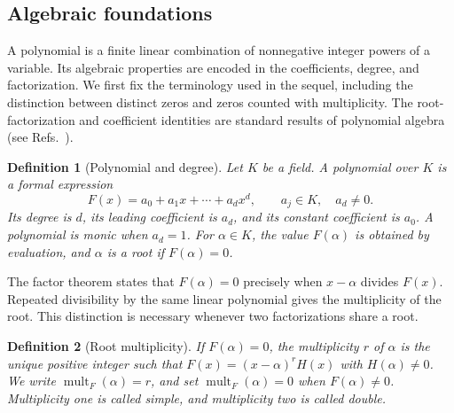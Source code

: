\documentclass[11pt,a4paper]{article}
\numberwithin{equation}{section}
\theoremstyle{uprightpaper}
\newtheorem{definition}{Definition}[section]
\newcommand{\mult}{\operatorname{mult}}
\begin{document}
\subsection{Algebraic foundations}\label{subsec:polynomial-foundations}

A polynomial is a finite linear combination of nonnegative integer powers of a variable. Its algebraic properties are encoded in the coefficients, degree, and factorization. We first fix the terminology used in the sequel, including the distinction between distinct zeros and zeros counted with multiplicity. The root-factorization and coefficient identities are standard results of polynomial algebra (see Refs.~\cite{barbeau1989, dummit2004}).

\begin{definition}[Polynomial and degree]\label{def:polynomial}
Let $K$ be a field. A polynomial over $K$ is a formal expression
\begin{equation}\label{eq:polynomial}
 F(x)=a_0+a_1x+\cdots+a_dx^d,\qquad
 a_j\in K,\quad a_d\neq0.
\end{equation}
Its degree is $d$, its leading coefficient is $a_d$, and its constant coefficient is $a_0$. A polynomial is \emph{monic} when $a_d=1$. For $\alpha\in K$, the value $F(\alpha)$ is obtained by evaluation, and $\alpha$ is a root if $F(\alpha)=0$.
\end{definition}

The factor theorem states that $F(\alpha)=0$ precisely when $x-\alpha$
divides $F(x)$. Repeated divisibility by the same linear polynomial gives
the multiplicity of the root. This distinction is necessary whenever two
factorizations share a root.

\begin{definition}[Root multiplicity]\label{def:mult}
If $F(\alpha)=0$, the multiplicity $r$ of $\alpha$ is the unique positive integer such that $F(x)=(x-\alpha)^rH(x)$ with $H(\alpha)\neq0$. We write $\mult_F(\alpha)=r$, and set $\mult_F(\alpha)=0$ when $F(\alpha)\neq0$. Multiplicity one is called \emph{simple}, and multiplicity two is called \emph{double}.
\end{definition}
\end{document}
